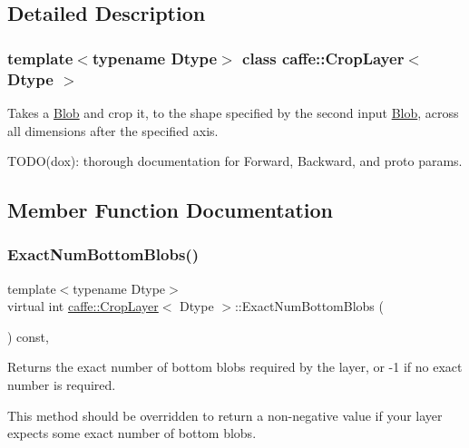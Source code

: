 \subsection{Detailed Description}
\subsubsection*{template$<$typename Dtype$>$\newline
class caffe\+::\+Crop\+Layer$<$ Dtype $>$}

Takes a \mbox{\hyperlink{classcaffe_1_1_blob}{Blob}} and crop it, to the shape specified by the second input \mbox{\hyperlink{classcaffe_1_1_blob}{Blob}}, across all dimensions after the specified axis. 

T\+O\+D\+O(dox)\+: thorough documentation for Forward, Backward, and proto params. 

\subsection{Member Function Documentation}
\mbox{\label{classcaffe_1_1_crop_layer_ac6386917437ef54003bb7f8c2618f5fe}} 
\subsubsection{\texorpdfstring{Exact\+Num\+Bottom\+Blobs()}{ExactNumBottomBlobs()}\hspace{0.1cm}{\footnotesize\ttfamily [1/2]}}
{\footnotesize\ttfamily template$<$typename Dtype$>$ \\
virtual int \mbox{\hyperlink{classcaffe_1_1_crop_layer}{caffe\+::\+Crop\+Layer}}$<$ Dtype $>$\+::Exact\+Num\+Bottom\+Blobs (\begin{DoxyParamCaption}{ }\end{DoxyParamCaption}) const\hspace{0.3cm}{\ttfamily [inline]}, {\ttfamily [virtual]}}



Returns the exact number of bottom blobs required by the layer, or -\/1 if no exact number is required. 

This method should be overridden to return a non-\/negative value if your layer expects some exact number of bottom blobs. 

